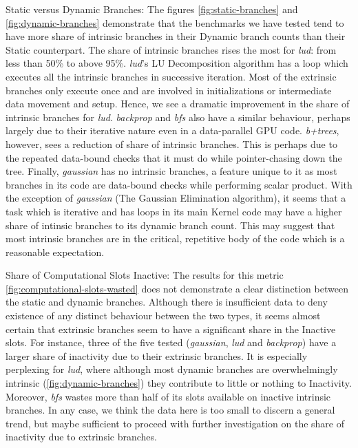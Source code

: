 

\label{sec:discussion}
\par{Static versus Dynamic Branches: The figures \ref{fig:static-branches} and \ref{fig:dynamic-branches} demonstrate that the benchmarks we have
tested tend to have more share of intrinsic branches in their Dynamic branch counts than their Static counterpart. The share of intrinsic branches rises the most for \textsl{lud}: from less than 50\% to above 95\%. \textsl{lud}'s LU Decomposition algorithm has a loop which executes all the intrinsic branches in successive iteration. Most of the extrinsic branches only execute once and are involved in initializations or intermediate data movement and setup. Hence, we see a dramatic improvement in the share of intrinsic branches for \textsl{lud}. \textsl{backprop} and \textsl{bfs} also have a similar behaviour, perhaps largely due to their iterative nature even in a data-parallel GPU code. \textsl{b+trees}, however, sees a reduction of share of intrinsic branches. This is perhaps due to the repeated data-bound checks that it must do while pointer-chasing down the tree. Finally, \textsl{gaussian} has no intrinsic branches, a feature unique to it as most branches in its code are data-bound checks while performing scalar product. With the exception of \textsl{gaussian} (The Gaussian Elimination algorithm), it seems that a task which is iterative and has loops in its main Kernel code may have a higher share of intinsic branches to its dynamic branch count. This may suggest that most intrinsic branches are in the critical, repetitive body of the code which is a reasonable expectation.}

\par{Share of Computational Slots Inactive: The results for this metric \ref{fig:computational-slots-wasted} does not demonstrate a clear distinction between the static and dynamic branches. Although there is insufficient data to deny existence of any distinct behaviour between the two types, it seems almost certain that extrinsic branches seem to have a significant share in the Inactive slots. For instance, three of the five tested (\textsl{gaussian}, \textsl{lud} and \textsl{backprop}) have a larger share of inactivity due to their extrinsic branches. It is especially perplexing for \textsl{lud}, where although most dynamic branches are overwhelmingly intrinsic (\ref{fig:dynamic-branches}) they contribute to little or nothing to Inactivity. Moreover, \textsl{bfs} wastes more than half of its slots available on inactive intrinsic branches. In any case, we think the data here is too small to discern a general trend, but maybe sufficient to proceed with further investigation on the share of inactivity due to extrinsic branches.
}

